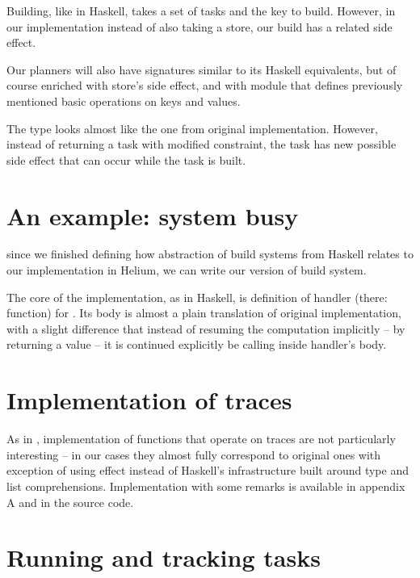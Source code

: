 Building, like in Haskell, takes a set of tasks and the key to build. However, in our implementation instead of also taking a store, our build has a related side effect.

Our planners will also have signatures similar to its Haskell equivalents, but of course enriched with store's side effect, and with module that defines previously mentioned basic operations on keys and values.



The  type looks almost like the one from original implementation. However, instead of returning a task with modified constraint, the task has new possible side effect that can occur while the task is built.

\section{An example: system busy}

since we finished defining how abstraction of build systems from Haskell relates to our implementation in Helium, we can write our version of  build system.



The core of the implementation, as in Haskell, is definition of handler (there: function) for . Its body is almost a plain translation of original implementation, with a slight difference that instead of resuming the computation implicitly -- by returning a value -- it is continued explicitly be calling  inside handler's body.

\section{Implementation of traces}

As in \BSaLC{}, implementation of functions that operate on traces are not particularly interesting -- in our cases they almost fully correspond to original ones with exception of using  effect instead of Haskell's infrastructure built around  type and list comprehensions. Implementation with some remarks is available in appendix A and in the source code.

\section{Running and tracking tasks}

